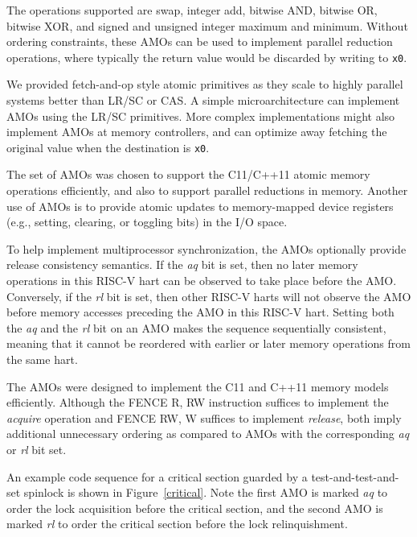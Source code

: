 The operations supported are swap, integer add, bitwise AND, bitwise
OR, bitwise XOR, and signed and unsigned integer maximum and minimum.
Without ordering constraints, these AMOs can be used to implement
parallel reduction operations, where typically the return value would
be discarded by writing to {\tt x0}.

\begin{commentary}
We provided fetch-and-op style atomic primitives as they scale to
highly parallel systems better than LR/SC or CAS.  A simple
microarchitecture can implement AMOs using the LR/SC primitives.  More
complex implementations might also implement AMOs at memory
controllers, and can optimize away fetching the original value when
the destination is {\tt x0}.

The set of AMOs was chosen to support the C11/C++11 atomic memory
operations efficiently, and also to support parallel reductions in
memory.  Another use of AMOs is to provide atomic updates to
memory-mapped device registers (e.g., setting, clearing, or toggling
bits) in the I/O space.
\end{commentary}

To help implement multiprocessor synchronization, the AMOs optionally
provide release consistency semantics.  If the {\em aq} bit is set,
then no later memory operations in this RISC-V hart can be observed
to take place before the AMO.
Conversely, if the {\em rl} bit is set, then other
RISC-V harts will not observe the AMO before memory accesses
preceding the AMO in this RISC-V hart.  Setting both the {\em aq} and the {\em
rl} bit on an AMO makes the sequence sequentially consistent, meaning that
it cannot be reordered with earlier or later memory operations from the same
hart.

\begin{commentary}
The AMOs were designed to implement the C11 and C++11 memory models
efficiently.  Although the FENCE R, RW instruction suffices to
implement the {\em acquire} operation and FENCE RW, W suffices to
implement {\em release}, both imply additional unnecessary ordering as
compared to AMOs with the corresponding {\em aq} or {\em rl} bit set.
\end{commentary}

An example code sequence for a critical section guarded by a
test-and-test-and-set spinlock is shown in Figure~\ref{critical}.  Note the
first AMO is marked {\em aq} to order the lock acquisition before the
critical section, and the second AMO is marked {\em rl} to order
the critical section before the lock relinquishment.

